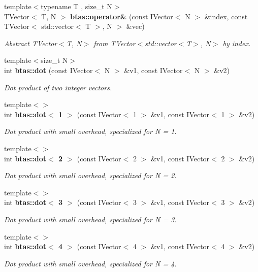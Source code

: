 \begin{DoxyCompactItemize}
{\footnotesize template$<$typename T , size\-\_\-t N$>$ }\\T\-Vector$<$ T, N $>$ {\bf btas\-::operator\&} (const I\-Vector$<$ N $>$ \&index, const T\-Vector$<$ std\-::vector$<$ T $>$, N $>$ \&vec)
\begin{DoxyCompactList}\small\item\em Abstract T\-Vector$<$\-T, N$>$ from T\-Vector$<$std\-::vector$<$\-T$>$, N$>$ by index. \end{DoxyCompactList}\item 
{\footnotesize template$<$size\-\_\-t N$>$ }\\int {\bf btas\-::dot} (const I\-Vector$<$ N $>$ \&v1, const I\-Vector$<$ N $>$ \&v2)
\begin{DoxyCompactList}\small\item\em Dot product of two integer vectors. \end{DoxyCompactList}\item 
{\footnotesize template$<$$>$ }\\int {\bf btas\-::dot$<$ 1 $>$} (const I\-Vector$<$ 1 $>$ \&v1, const I\-Vector$<$ 1 $>$ \&v2)
\begin{DoxyCompactList}\small\item\em Dot product with small overhead, specialized for N = 1. \end{DoxyCompactList}\item 
{\footnotesize template$<$$>$ }\\int {\bf btas\-::dot$<$ 2 $>$} (const I\-Vector$<$ 2 $>$ \&v1, const I\-Vector$<$ 2 $>$ \&v2)
\begin{DoxyCompactList}\small\item\em Dot product with small overhead, specialized for N = 2. \end{DoxyCompactList}\item 
{\footnotesize template$<$$>$ }\\int {\bf btas\-::dot$<$ 3 $>$} (const I\-Vector$<$ 3 $>$ \&v1, const I\-Vector$<$ 3 $>$ \&v2)
\begin{DoxyCompactList}\small\item\em Dot product with small overhead, specialized for N = 3. \end{DoxyCompactList}\item 
{\footnotesize template$<$$>$ }\\int {\bf btas\-::dot$<$ 4 $>$} (const I\-Vector$<$ 4 $>$ \&v1, const I\-Vector$<$ 4 $>$ \&v2)
\begin{DoxyCompactList}\small\item\em Dot product with small overhead, specialized for N = 4. \end{DoxyCompactList}\item 

\end{DoxyCompactItemize}
